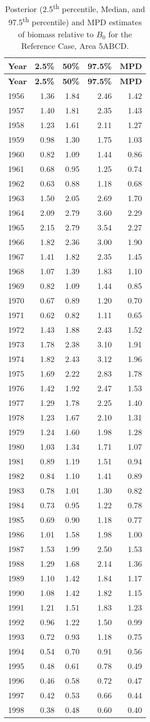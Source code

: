 \documentclass[11pt]{book}
\begin{document}
\begin{longtable}[]{@{}lrrrr@{}}
\caption{\label{tab:tab-post-depl-5abcd}Posterior (2.5\textsuperscript{th} percentile, Median, and 97.5\textsuperscript{th} percentile) and MPD estimates of biomass relative to \(B_0\) for the Reference Case, Area 5ABCD.}\tabularnewline
\toprule
\textbf{Year} & \textbf{2.5\%} & \textbf{50\%} & \textbf{97.5\%} & \textbf{MPD}\tabularnewline
\midrule
\endfirsthead
\toprule
\textbf{Year} & \textbf{2.5\%} & \textbf{50\%} & \textbf{97.5\%} & \textbf{MPD}\tabularnewline
\midrule
\endhead
1956 & 1.36 & 1.84 & 2.46 & 1.42\tabularnewline
1957 & 1.40 & 1.81 & 2.35 & 1.43\tabularnewline
1958 & 1.23 & 1.61 & 2.11 & 1.27\tabularnewline
1959 & 0.98 & 1.30 & 1.75 & 1.03\tabularnewline
1960 & 0.82 & 1.09 & 1.44 & 0.86\tabularnewline
1961 & 0.68 & 0.95 & 1.25 & 0.74\tabularnewline
1962 & 0.63 & 0.88 & 1.18 & 0.68\tabularnewline
1963 & 1.50 & 2.05 & 2.69 & 1.70\tabularnewline
1964 & 2.09 & 2.79 & 3.60 & 2.29\tabularnewline
1965 & 2.15 & 2.79 & 3.54 & 2.27\tabularnewline
1966 & 1.82 & 2.36 & 3.00 & 1.90\tabularnewline
1967 & 1.41 & 1.82 & 2.35 & 1.45\tabularnewline
1968 & 1.07 & 1.39 & 1.83 & 1.10\tabularnewline
1969 & 0.82 & 1.09 & 1.44 & 0.85\tabularnewline
1970 & 0.67 & 0.89 & 1.20 & 0.70\tabularnewline
1971 & 0.62 & 0.82 & 1.11 & 0.65\tabularnewline
1972 & 1.43 & 1.88 & 2.43 & 1.52\tabularnewline
1973 & 1.78 & 2.38 & 3.10 & 1.91\tabularnewline
1974 & 1.82 & 2.43 & 3.12 & 1.96\tabularnewline
1975 & 1.69 & 2.22 & 2.83 & 1.78\tabularnewline
1976 & 1.42 & 1.92 & 2.47 & 1.53\tabularnewline
1977 & 1.29 & 1.78 & 2.25 & 1.40\tabularnewline
1978 & 1.23 & 1.67 & 2.10 & 1.31\tabularnewline
1979 & 1.24 & 1.60 & 1.98 & 1.28\tabularnewline
1980 & 1.03 & 1.34 & 1.71 & 1.07\tabularnewline
1981 & 0.89 & 1.19 & 1.51 & 0.94\tabularnewline
1982 & 0.84 & 1.10 & 1.41 & 0.89\tabularnewline
1983 & 0.78 & 1.01 & 1.30 & 0.82\tabularnewline
1984 & 0.73 & 0.95 & 1.22 & 0.78\tabularnewline
1985 & 0.69 & 0.90 & 1.18 & 0.77\tabularnewline
1986 & 1.01 & 1.58 & 1.98 & 1.00\tabularnewline
1987 & 1.53 & 1.99 & 2.50 & 1.53\tabularnewline
1988 & 1.29 & 1.68 & 2.14 & 1.36\tabularnewline
1989 & 1.10 & 1.42 & 1.84 & 1.17\tabularnewline
1990 & 1.08 & 1.42 & 1.82 & 1.15\tabularnewline
1991 & 1.21 & 1.51 & 1.83 & 1.23\tabularnewline
1992 & 0.96 & 1.22 & 1.50 & 0.99\tabularnewline
1993 & 0.72 & 0.93 & 1.18 & 0.75\tabularnewline
1994 & 0.54 & 0.70 & 0.91 & 0.56\tabularnewline
1995 & 0.48 & 0.61 & 0.78 & 0.49\tabularnewline
1996 & 0.46 & 0.58 & 0.72 & 0.47\tabularnewline
1997 & 0.42 & 0.53 & 0.66 & 0.44\tabularnewline
1998 & 0.38 & 0.48 & 0.60 & 0.40\tabularnewline

\end{longtable}
\end{document}
